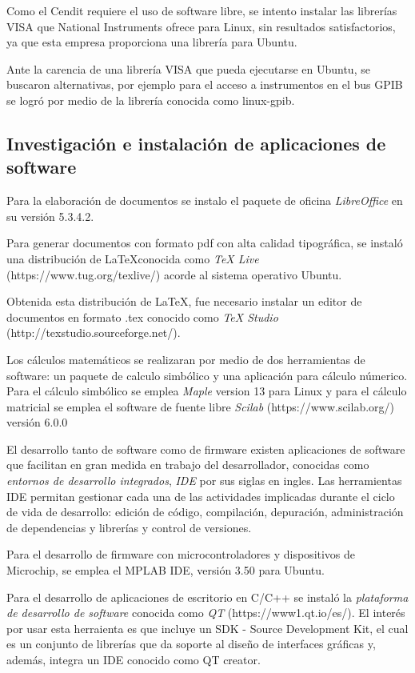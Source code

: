 \documentclass[paper=letter,oneside,fontsize=12pt, parskip=full]{article}
\begin{document}
	Como el Cendit requiere el uso de software libre, se intento instalar las librerías VISA que National Instruments ofrece para Linux, sin resultados satisfactorios, ya que esta empresa proporciona una librería para Ubuntu.	
	
	Ante la carencia de una librería VISA que pueda ejecutarse en Ubuntu, se buscaron alternativas, por ejemplo para el acceso a instrumentos en el bus GPIB se logró por medio de la librería conocida como linux-gpib.
	
	\subsection{Investigación e instalación de aplicaciones de software}
	
	Para la elaboración de documentos se instalo el paquete de oficina \emph{LibreOffice} en su versión 5.3.4.2.
	
	Para generar documentos con formato pdf con alta calidad tipográfica, se instaló una distribución de \LaTeX conocida como \emph{TeX Live} (https://www.tug.org/texlive/) acorde al sistema operativo Ubuntu. 
	
	Obtenida esta distribución de \LaTeX, fue necesario instalar un editor de documentos en formato .tex conocido como \emph{TeX Studio} (http://texstudio.sourceforge.net/). 
	
	Los cálculos matemáticos se realizaran por medio de dos herramientas de software: un paquete de calculo simbólico y una aplicación para cálculo númerico. Para el cálculo simbólico se emplea \emph{Maple} version 13 para Linux y para el cálculo matricial se emplea el software de fuente libre \emph{Scilab} (https://www.scilab.org/) versión 6.0.0
	
	El desarrollo tanto de software como de firmware existen aplicaciones de software que facilitan en gran medida en trabajo del desarrollador, conocidas como \emph{entornos de desarrollo integrados}, \emph{IDE} por sus siglas en ingles. Las herramientas IDE permitan gestionar cada una de las actividades implicadas durante el ciclo de vida de desarrollo: edición de código, compilación,  depuración, administración de dependencias y librerías y control de versiones.
	
	Para el desarrollo de firmware con microcontroladores y dispositivos de Microchip, se emplea el MPLAB IDE, versión 3.50 para Ubuntu.
	
	Para el desarrollo de aplicaciones de escritorio en C/C++ se instaló la \emph{plataforma de desarrollo de software} conocida como \emph{QT} (https://www1.qt.io/es/). El interés por usar esta herraienta es que incluye un SDK - Source Development Kit, el cual es un conjunto de librerías que da soporte al diseño de interfaces gráficas y, además, integra un IDE conocido como QT creator.
	
\end{document}
